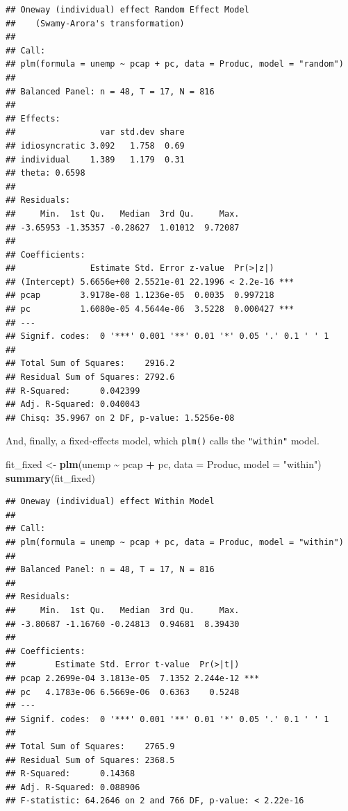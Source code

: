 \documentclass[
  12pt,
  oneside,openany]{book}
\newenvironment{Shaded}{\begin{snugshade}}{\end{snugshade}}
\newcommand{\DataTypeTok}[1]{\textcolor[rgb]{0.13,0.29,0.53}{#1}}
\newcommand{\KeywordTok}[1]{\textcolor[rgb]{0.13,0.29,0.53}{\textbf{#1}}}
\newcommand{\NormalTok}[1]{#1}
\newcommand{\OperatorTok}[1]{\textcolor[rgb]{0.81,0.36,0.00}{\textbf{#1}}}
\newcommand{\StringTok}[1]{\textcolor[rgb]{0.31,0.60,0.02}{#1}}
\begin{document}
\begin{verbatim}
## Oneway (individual) effect Random Effect Model 
##    (Swamy-Arora's transformation)
## 
## Call:
## plm(formula = unemp ~ pcap + pc, data = Produc, model = "random")
## 
## Balanced Panel: n = 48, T = 17, N = 816
## 
## Effects:
##                 var std.dev share
## idiosyncratic 3.092   1.758  0.69
## individual    1.389   1.179  0.31
## theta: 0.6598
## 
## Residuals:
##     Min.  1st Qu.   Median  3rd Qu.     Max. 
## -3.65953 -1.35357 -0.28627  1.01012  9.72087 
## 
## Coefficients:
##               Estimate Std. Error z-value  Pr(>|z|)    
## (Intercept) 5.6656e+00 2.5521e-01 22.1996 < 2.2e-16 ***
## pcap        3.9178e-08 1.1236e-05  0.0035  0.997218    
## pc          1.6080e-05 4.5644e-06  3.5228  0.000427 ***
## ---
## Signif. codes:  0 '***' 0.001 '**' 0.01 '*' 0.05 '.' 0.1 ' ' 1
## 
## Total Sum of Squares:    2916.2
## Residual Sum of Squares: 2792.6
## R-Squared:      0.042399
## Adj. R-Squared: 0.040043
## Chisq: 35.9967 on 2 DF, p-value: 1.5256e-08
\end{verbatim}

And, finally, a fixed-effects model, which \texttt{plm()} calls the \texttt{"within"} model.

\begin{Shaded}
\begin{Highlighting}[]
\NormalTok{fit\_fixed <{-}}\StringTok{ }\KeywordTok{plm}\NormalTok{(unemp }\OperatorTok{\textasciitilde{}}\StringTok{ }\NormalTok{pcap }\OperatorTok{+}\StringTok{ }\NormalTok{pc,}
                 \DataTypeTok{data =}\NormalTok{ Produc,}
                 \DataTypeTok{model =} \StringTok{"within"}\NormalTok{)}
\KeywordTok{summary}\NormalTok{(fit\_fixed)}
\end{Highlighting}
\end{Shaded}

\begin{verbatim}
## Oneway (individual) effect Within Model
## 
## Call:
## plm(formula = unemp ~ pcap + pc, data = Produc, model = "within")
## 
## Balanced Panel: n = 48, T = 17, N = 816
## 
## Residuals:
##     Min.  1st Qu.   Median  3rd Qu.     Max. 
## -3.80687 -1.16760 -0.24813  0.94681  8.39430 
## 
## Coefficients:
##        Estimate Std. Error t-value  Pr(>|t|)    
## pcap 2.2699e-04 3.1813e-05  7.1352 2.244e-12 ***
## pc   4.1783e-06 6.5669e-06  0.6363    0.5248    
## ---
## Signif. codes:  0 '***' 0.001 '**' 0.01 '*' 0.05 '.' 0.1 ' ' 1
## 
## Total Sum of Squares:    2765.9
## Residual Sum of Squares: 2368.5
## R-Squared:      0.14368
## Adj. R-Squared: 0.088906
## F-statistic: 64.2646 on 2 and 766 DF, p-value: < 2.22e-16
\end{verbatim}
\end{document}
